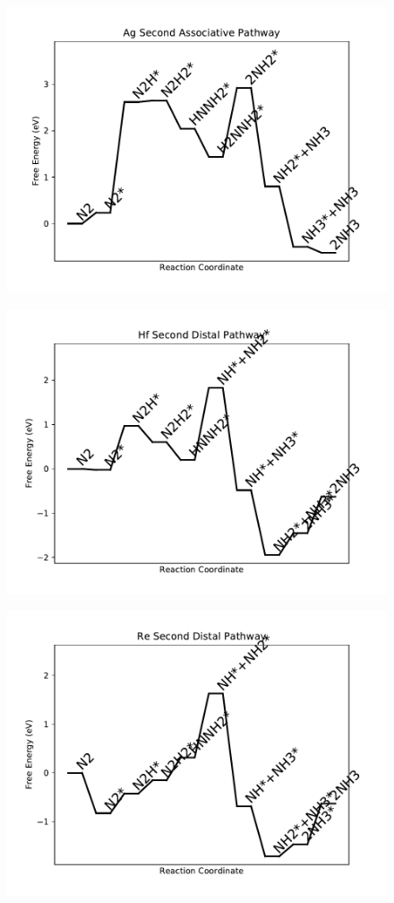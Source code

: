 \begin{figure}
\includegraphics[width=0.8\linewidth]{data/plots/Ag_associative_2.pdf}
\label{fig:Ag_associative_2}
\end{figure}

\begin{figure}
\includegraphics[width=0.8\linewidth]{data/plots/Hf_distal_2.pdf}
\label{fig:Hf_distal_2}
\end{figure}

\begin{figure}
\includegraphics[width=0.8\linewidth]{data/plots/Re_distal_2.pdf}
\label{fig:Re_distal_2}
\end{figure}

